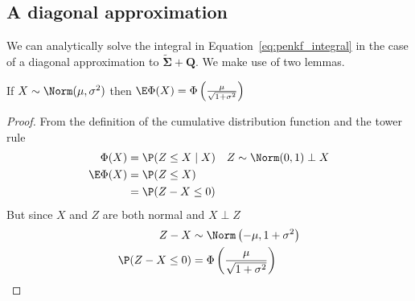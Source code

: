 \documentclass[12pt]{article}
\begin{document}
\subsection{A diagonal approximation}

We can analytically solve the integral in Equation~\eqref{eq:penkf_integral} in
the case of a diagonal approximation to $\tilde{\mathbf\Sigma} + \mathbf Q$. We make
use of two lemmas.

\begin{lemma}\label{lemma:icdf}
    If $X \sim \Norm(\mu, \sigma^2)$ then
    $\E\Phi(X) = \Phi\left(\frac{\mu}{\sqrt{1+\sigma^2}}\right)$
\end{lemma}
\begin{proof}
    From the definition of the cumulative distribution function and the tower rule
    \begin{align}
        \Phi(X) &= \P(Z \leq X \mid X) \quad Z \sim \Norm(0,1) \perp X \\
        \E\Phi(X) &= \P(Z \leq X) \\
        &= \P(Z - X \leq 0)
    \end{align}
    But since $X$ and $Z$ are both normal and $X \perp Z$
    \begin{align}
        Z - X &\sim \Norm\left(-\mu, 1+\sigma^2\right) \\
        \P(Z-X \leq 0) &= \Phi\left(\frac{\mu}{\sqrt{1+\sigma^2}}\right)
    \end{align}
\end{proof}
\end{document}
